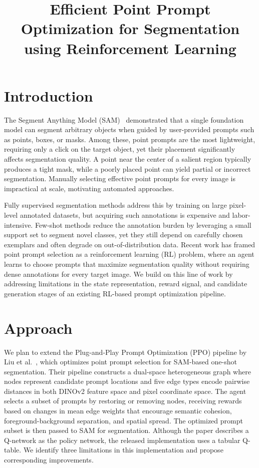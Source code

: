 \documentclass[conference]{IEEEtran}
\begin{document}
\title{Efficient Point Prompt Optimization for Segmentation using Reinforcement Learning}

\author{
}

\maketitle

\section{Introduction}

The Segment Anything Model (SAM)~\cite{Kirillov2023SAM} demonstrated that a single foundation model can segment arbitrary objects when guided by user-provided prompts such as points, boxes, or masks. Among these, point prompts are the most lightweight, requiring only a click on the target object, yet their placement significantly affects segmentation quality. A point near the center of a salient region typically produces a tight mask, while a poorly placed point can yield partial or incorrect segmentation. Manually selecting effective point prompts for every image is impractical at scale, motivating automated approaches.

Fully supervised segmentation methods address this by training on large pixel-level annotated datasets, but acquiring such annotations is expensive and labor-intensive. Few-shot methods reduce the annotation burden by leveraging a small support set to segment novel classes, yet they still depend on carefully chosen exemplars and often degrade on out-of-distribution data. Recent work has framed point prompt selection as a reinforcement learning (RL) problem, where an agent learns to choose prompts that maximize segmentation quality without requiring dense annotations for every target image. We build on this line of work by addressing limitations in the state representation, reward signal, and candidate generation stages of an existing RL-based prompt optimization pipeline.

\section{Approach}

We plan to extend the Plug-and-Play Prompt Optimization (PPO) pipeline by Liu et al.~\cite{Liu2025PPO}, which optimizes point prompt selection for SAM-based one-shot segmentation. Their pipeline constructs a dual-space heterogeneous graph where nodes represent candidate prompt locations and five edge types encode pairwise distances in both DINOv2 feature space and pixel coordinate space. The agent selects a subset of prompts by restoring or removing nodes, receiving rewards based on changes in mean edge weights that encourage semantic cohesion, foreground-background separation, and spatial spread. The optimized prompt subset is then passed to SAM for segmentation. Although the paper describes a Q-network as the policy network, the released implementation uses a tabular Q-table. We identify three limitations in this implementation and propose corresponding improvements.
\end{document}
